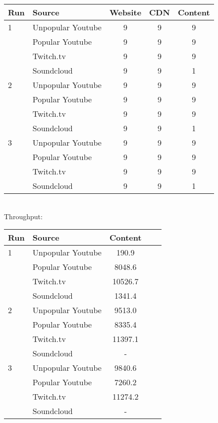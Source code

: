 \documentclass{sig-alternate-05-2015}
\begin{document}
{\small
\begin{tabular}{|l|l|c|c|c|} \hline
Run & Source & Website & CDN & Content \\ \hline
1 & Unpopular Youtube & 9 & 9 & 9 \\ \hline
  & Popular Youtube   & 9 & 9 & 9 \\ \hline
  & Twitch.tv         & 9 & 9 & 9 \\ \hline
  & Soundcloud        & 9 & 9 & 1 \\ \hline
2 & Unpopular Youtube & 9 & 9 & 9 \\ \hline
  & Popular Youtube   & 9 & 9 & 9 \\ \hline
  & Twitch.tv         & 9 & 9 & 9 \\ \hline
  & Soundcloud        & 9 & 9 & 1 \\ \hline
3 & Unpopular Youtube & 9 & 9 & 9 \\ \hline
  & Popular Youtube   & 9 & 9 & 9 \\ \hline
  & Twitch.tv         & 9 & 9 & 9 \\ \hline
  & Soundcloud        & 9 & 9 & 1 \\ \hline
\end{tabular}}
\vspace{1em} \\
Throughput: \\
{\small
\begin{tabular}{|l|l|c|c|c|} \hline
Run & Source & Content \\ \hline
1 & Unpopular Youtube & 190.9   \\ \hline
  & Popular Youtube   & 8048.6  \\ \hline
  & Twitch.tv         & 10526.7 \\ \hline
  & Soundcloud        & 1341.4  \\ \hline
2 & Unpopular Youtube & 9513.0  \\ \hline
  & Popular Youtube   & 8335.4  \\ \hline
  & Twitch.tv         & 11397.1 \\ \hline
  & Soundcloud        & -       \\ \hline
3 & Unpopular Youtube & 9840.6  \\ \hline
  & Popular Youtube   & 7260.2  \\ \hline
  & Twitch.tv         & 11274.2 \\ \hline  
  & Soundcloud        & -       \\ \hline
\end{tabular}}
\end{document}
